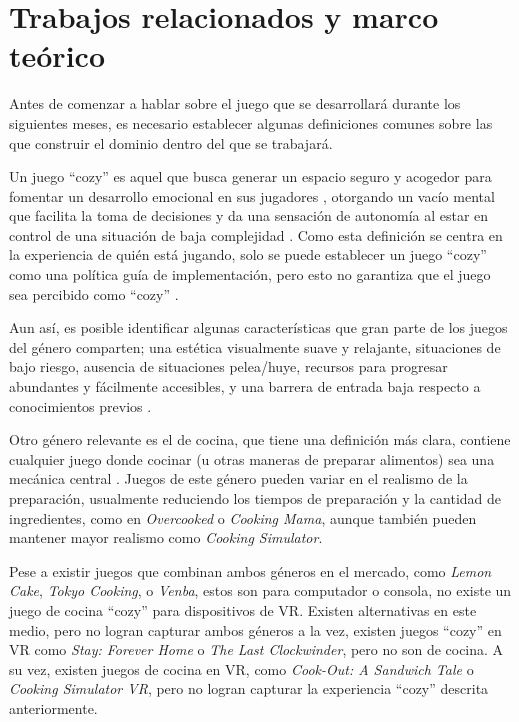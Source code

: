 \documentclass[conference]{IEEEtran}
\begin{document}
\section{Trabajos relacionados y marco teórico}

Antes de comenzar a hablar sobre el juego que se desarrollará durante los siguientes meses, es necesario establecer algunas definiciones comunes sobre las que construir el dominio dentro del que se trabajará.\medskip

Un juego “cozy” es aquel que busca generar un espacio seguro y acogedor para fomentar un desarrollo emocional en sus jugadores \cite{CozinessInGames}, otorgando un vacío mental que facilita la toma de decisiones y da una sensación de autonomía al estar en control de una situación de baja complejidad \cite{CozyCoping}. Como esta definición se centra en la experiencia de quién está jugando, solo se puede establecer un juego “cozy” como una política guía de implementación, pero esto no garantiza que el juego sea percibido como “cozy” \cite{AllIsCozy}.\medskip

Aun así, es posible identificar algunas características que gran parte de los juegos del género comparten; una estética visualmente suave y relajante, situaciones de bajo riesgo, ausencia de situaciones pelea/huye, recursos para progresar abundantes y fácilmente accesibles, y una barrera de entrada baja respecto a conocimientos previos \cite{WhoseVibe}.\medskip

Otro género relevante es el de cocina, que tiene una definición más clara, contiene cualquier juego donde cocinar (u otras maneras de preparar alimentos) sea una mecánica central \cite{MobyGames}. Juegos de este género pueden variar en el realismo de la preparación, usualmente reduciendo los tiempos de preparación y la cantidad de ingredientes, como en \textit{Overcooked} o \textit{Cooking Mama}, aunque también pueden mantener mayor realismo como \textit{Cooking Simulator}. \medskip

Pese a existir juegos que combinan ambos géneros en el mercado, como \textit{Lemon Cake}, \textit{Tokyo Cooking}, o \textit{Venba}, estos son para computador o consola, no existe un juego de cocina “cozy” para dispositivos de VR. Existen alternativas en este medio, pero no logran capturar ambos géneros a la vez, existen juegos “cozy” en VR como \textit{Stay: Forever Home} o \textit{The Last Clockwinder}, pero no son de cocina. A su vez, existen juegos de cocina en VR, como \textit{Cook-Out: A Sandwich Tale} o \textit{Cooking Simulator VR}, pero no logran capturar la experiencia “cozy” descrita anteriormente.\medskip
\end{document}
